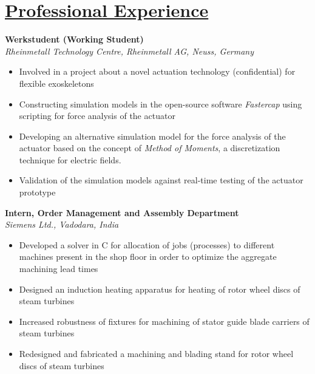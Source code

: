 \section{\underline{Professional Experience}}
\large{\textbf{Werkstudent (Working Student)}}
\hspace{3.1 in}
\rheinmetalldate\\
\large{\textit{Rheinmetall Technology Centre, Rheinmetall AG, Neuss, Germany}}
\begin{itemize}
\item\large{Involved in a project about a novel actuation technology (confidential) for flexible exoskeletons}
\item\large{Constructing simulation models in the open-source software \emph{Fastercap} using scripting for force analysis of the actuator}
\item\large{Developing an alternative simulation model for the force analysis of the actuator based on the concept of \emph{Method of Moments}, a discretization technique for electric fields.}
\item\large{Validation of the simulation models against real-time testing of the actuator prototype}
\end{itemize}

\large{\textbf{Intern, Order Management and Assembly Department}}
\hspace{1.2 in}
\siemensdate\\
\large{\textit{Siemens Ltd., Vadodara, India}}
\begin{itemize}
\item\large{Developed a solver in C for allocation of jobs (processes) to different machines present in the shop floor in order to optimize the aggregate machining lead times}
\item\large{Designed an induction heating apparatus for heating of rotor wheel discs of steam turbines}
\item\large{Increased robustness of fixtures for machining of stator guide blade carriers of steam turbines}
\item\large{Redesigned and fabricated a machining and blading stand for rotor wheel discs of steam turbines }
\end{itemize}